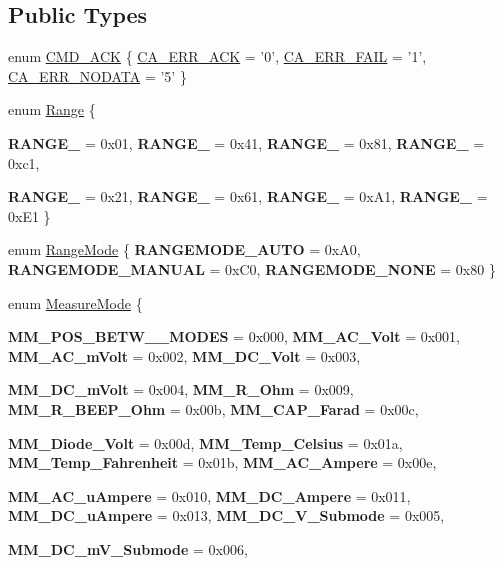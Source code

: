 \subsection*{Public Types}
\begin{DoxyCompactItemize}
\item 
enum \hyperlink{classFluke_1_1Fluke189_a1dc3e71946821b69a497313c15a563d6}{CMD\_\-ACK} \{ \hyperlink{classFluke_1_1Fluke189_a1dc3e71946821b69a497313c15a563d6adfe46b4cef1f6ea04b2f3b0abee5092c}{CA\_\-ERR\_\-ACK} =  '0', 
\hyperlink{classFluke_1_1Fluke189_a1dc3e71946821b69a497313c15a563d6ac157cd20279d9b6cba70f8da4ffbeb35}{CA\_\-ERR\_\-FAIL} =  '1', 
\hyperlink{classFluke_1_1Fluke189_a1dc3e71946821b69a497313c15a563d6aeb64e037c0e59e7577ba976ee3b25a20}{CA\_\-ERR\_\-NODATA} =  '5'
 \}
\item 
enum \hyperlink{classFluke_1_1Fluke189_a8112c52d8588d0cce468376e2faa83f5}{Range} \{ \par
{\bfseries RANGE\_} = 0x01, 
{\bfseries RANGE\_} = 0x41, 
{\bfseries RANGE\_} = 0x81, 
{\bfseries RANGE\_} = 0xc1, 
\par
{\bfseries RANGE\_} = 0x21, 
{\bfseries RANGE\_} = 0x61, 
{\bfseries RANGE\_} = 0xA1, 
{\bfseries RANGE\_} = 0xE1
 \}
\item 
enum \hyperlink{classFluke_1_1Fluke189_a470ac0e0a6e44ca3b33d2307ef29f37d}{RangeMode} \{ {\bfseries RANGEMODE\_\-AUTO} = 0xA0, 
{\bfseries RANGEMODE\_\-MANUAL} = 0xC0, 
{\bfseries RANGEMODE\_\-NONE} = 0x80
 \}
\item 
enum \hyperlink{classFluke_1_1Fluke189_a9122f47da123e82f492c9cfcb29e5f2e}{MeasureMode} \{ \par
{\bfseries MM\_\-POS\_\-BETW\_\_\-MODES} = 0x000, 
{\bfseries MM\_\-AC\_\-Volt} = 0x001, 
{\bfseries MM\_\-AC\_\-mVolt} = 0x002, 
{\bfseries MM\_\-DC\_\-Volt} = 0x003, 
\par
{\bfseries MM\_\-DC\_\-mVolt} = 0x004, 
{\bfseries MM\_\-R\_\-Ohm} = 0x009, 
{\bfseries MM\_\-R\_\-BEEP\_\-Ohm} = 0x00b, 
{\bfseries MM\_\-CAP\_\-Farad} = 0x00c, 
\par
{\bfseries MM\_\-Diode\_\-Volt} = 0x00d, 
{\bfseries MM\_\-Temp\_\-Celsius} = 0x01a, 
{\bfseries MM\_\-Temp\_\-Fahrenheit} = 0x01b, 
{\bfseries MM\_\-AC\_\-Ampere} = 0x00e, 
\par
{\bfseries MM\_\-AC\_\-uAmpere} = 0x010, 
{\bfseries MM\_\-DC\_\-Ampere} = 0x011, 
{\bfseries MM\_\-DC\_\-uAmpere} = 0x013, 
{\bfseries MM\_\-DC\_\-V\_\-Submode} = 0x005, 
\par
{\bfseries MM\_\-DC\_\-mV\_\-Submode} = 0x006, 

\end{DoxyCompactItemize}
